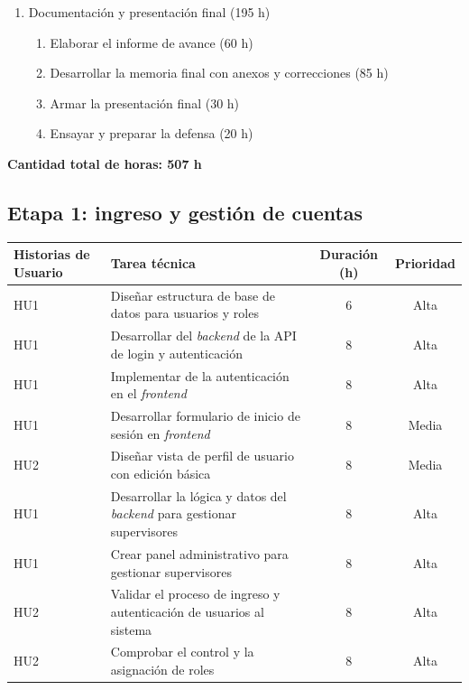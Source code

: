 \documentclass[
11pt, %
]{charter}
\begin{document}
\begin{enumerate}
    \item Documentación y presentación final (195 h)
    \begin{enumerate}
        \item Elaborar el informe de avance (60 h)
        \item Desarrollar la memoria final con anexos y correcciones (85 h)
        \item Armar la presentación final (30 h)
        \item Ensayar y preparar la defensa (20 h)
    \end{enumerate}
\end{enumerate}

\vspace{10pt}
\noindent \textbf{Cantidad total de horas: 507 h}



\subsection*{Etapa 1: ingreso y gestión de cuentas}
\begin{tabular}{|p{2.5cm}|p{7.5cm}|c|c|}
\hline
\textbf{Historias de Usuario} & \textbf{Tarea técnica} & \textbf{Duración (h)} & \textbf{Prioridad} \\
\hline
HU1 & Diseñar estructura de base de datos para usuarios y roles & 6 & Alta \\
\hline
HU1 & Desarrollar del \textit{backend} de la API de login y autenticación & 8 & Alta \\
\hline
HU1 & Implementar de la autenticación en el \textit{frontend} & 8 & Alta \\
\hline
HU1 & Desarrollar formulario de inicio de sesión en \textit{frontend} & 8 & Media \\
\hline
HU2 & Diseñar vista de perfil de usuario con edición básica & 8 & Media \\
\hline
HU1 & Desarrollar la lógica y datos del \textit{backend} para gestionar supervisores & 8 & Alta \\
\hline
HU1 & Crear panel administrativo para gestionar supervisores & 8 & Alta \\
\hline
HU2 & Validar el proceso de ingreso y autenticación de usuarios al sistema & 8 & Alta \\
\hline
HU2 & Comprobar el control y la asignación de roles & 8 & Alta \\
\hline
\end{tabular}
\end{document}

